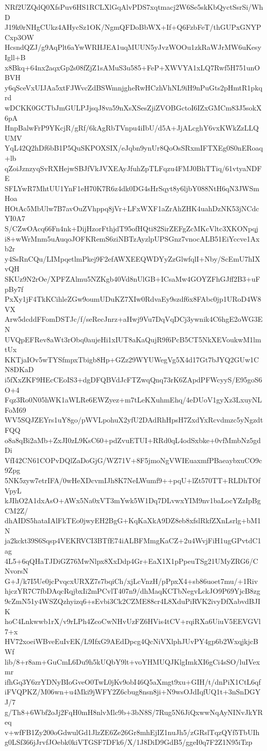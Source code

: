 NRf2UZQdQ0XfsPuv6HS1RCLXlGqAlvPDS7xqtmacj2W6Se5skKbQyctSsrSi/WhD
J19k0rNHgCUkz4AHycSz1OK/NgmQFDoBbWX+If+Q6FzbFeT/thGUPxGNYPCxp3OW
HcsndQZJ/g9AqPlt6aYwWRHJEA1uqMUUN5yJvzWOOu1zkRaWJrMW6uKesyIgll+B
x8Bkq+64nx2aqxGp2s08fZjZ1sAMuS3u585+FeP+XWVYA1xLQ7Rwf5H751unOBVH
y6qSceVxUIJAa5xtFJWvcZdBSWmnjgheRwHCzhVhNL9iH9nPuGts2pHmtR1pkqrd
wDCKK0GCTbJmGULPJjsqJ8va59nXsXSesZjiZVOBGctoI6IZxGMCm83J5sokX6pA
HnpBalwFrP9YKcjR/gRf/6kAgRbTVnpu4iIbU/d5A+JjALcghY6vxKWkZzLLQUMV
YqL42Q2hDf6bB1P5QuSKPOXSIX/eJqbn9ynUr8QoOsSRxmIFTXEg0S0nERoaq+lb
qZoiJznzyqSvRXHejwSBJfVkJVXEAyJfuhZpTLFqzu4FMJ0BhTTiq/61vtyaNDFE
SFLYwR7MhtUU1YnF1eH70K7R6z4dk0DG4sHrSqyt8y6ljbY088NtH6qN3JWSmHoa
HOtAc5MbUlw7B7avOuZVhppq8jVr+LFxWXF1aZrAhZHK4uahDzNK53jNCdcYI0A7
S/CZwOAcq66Fn4nk+DijHzorFthjdT95ofHQti82SirZEFgZcMKcVltc3XKONpqj
i8+wWrMnm5uAuqoJOFKRemS6ziNBTzAyzlpUPSGnz7vnocALB51EiYccve1Axb2r
y4SsRnCQu/LIMpqetlmPkej9F2efAWXEEQWDYyZzGlwfqlI+Nby/ScEmU7hIXvQH
SKUz9N2rOe/XPFZAlmu5NZKgb40Vd8nUlGB+ICsaMw4GOYZFhGJff2B3+uFpBy7f
PxXy1jF4TkKCihleZGw9oumUDuKZ7XIw0RdvaEy9szdf6x8FAbc0jp1URoD4W8VX
Arw5dcddFFomDSTJc/f/seRecJnrz+aHwj9Vu7DqVqDCj3ywnik4C6hgE2oWG3EN
UVQpEFRev8aWt3rObq0aujeHi1xIUT8aKaQujR9f6PcB5CT5NkXEVoukwM1lmtUx
KKTjaIOv5wTYSfmpxTbigb8Hp+GZz29WYUWegVg5X4d17Gt7bJYQ2GUw1CN8DKaD
i5fXxZKF9HEcCEoIS3+dgDFQBVdJcFTZwqQnq73rK6ZApdPFWcyyS/E95goS6O+4
Fqz3Ro0N05hWK1aWLRe6EWZyez+m7tLeKXuhmEhq/4eDUoV1gyXz3LxuyNLFoM69
WV5SQJZEYrs1uY8go/pWVLpohuX2yfU2DAdRhHpsH7ZxdYxRcvdmzc5yNgzdtFQQ
o8a8qBi2aMb+ZxJI0zL9KsC60+pdZvuETUI+RRd0qL4odSxbke+0vfMmbNz5gdDi
VfI42CN61COPvDQlZaDoGjG/WZ71V+8F5jmoNgVWIEuaxmfPBaeaybxuCO9c9Zpg
5NK5zyw7etrIFA/0wHeXDcvmIJh8K7NeLWumf9++pqU+lZt570TT+RLDhTOfVpyL
kJIhO2A1dxAsO+AWx5Na0xVT3mYwk5W1Dq7DLvwxYIM9nv1baLocYZzIpBgCM2Z/
dhAIDS5hataIAlFkTEo0jwyEH2BgG+KqKaXkA9DZ8eb8xfslRkfZXnLsrlg+bM1N
ja2kckt39S6Sqsp4VEKRVCI3BTfE74iALBFMmgKaCZ+2u4WvjFiH1ugGPvtdC1ag
4L5+6qQHaTJDiGZ76MwNlpx8XxDdp4Gr+EaX1X1pPpeuTSg21UMyZRG6/CNvorsN
G+J/k7I5Ue0jcPvqcxURXZ7s7bqiCh/xjLcVnzH/pPpxX4+sb86uoet7mu/+1Riv
hjczYR7C7fbDAqcRqjbxIi2mPCvlT407n9/dhMaqKCTbNegvLckJO9P69YjcB8zg
9cZmN51y4WSZQzhyizq6+sEvbi3Ck2CZME88cr4L8XduPiRVK2ivyDfXabvdBJIK
hoC4Lnkwwb1rX/v9rLPh4ZcoCwNHvUzFZ6HVis4tCV+rqiRXa6UiuV5EEVGVl7+x
HV72xoeiWBveEuIvEK/L9IfxG9AEdDpcg4QcNiVXlphJUvPY4gp6b2WxqjkjcBWf
lib/8+r8am+GuCmL6Du9h5kUQbY9lt+voYHMUQJKlgImkXI6gCi4sSO/luIVexmr
ifhGq3Y6zrYDNyBIoGveO0TwL0jKv9obI46Q5aXmgt9xu+GIH/t/dnPiX1CtL6qf
iFVQPKZ/M06wn+u4Mki9jWFY2Z6cbug8nsn8ji+N9wsOJdIqfUQ1t+3nSnDGYJ/7
g/Th8+6Wbf2oJj2FqH0mH8nlvMlc9b+3bN8S/7Rug5N6JiQxwwNqAyNINvJkYReq
v+wfFB1Zy200oGdwulGd1JlzZE6Ze26Gr8mhEjIZ1nuJh5/zGRslTqzQYf5TbUIh
g0LSf366jJrvfJOebk0kiVTGSF7DFk6/X/1J8DiD9GdB5/ggeI0q7F2Z1N95iTzp
